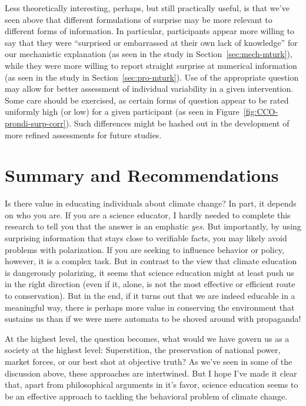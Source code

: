Less theoretically interesting, perhaps, but still practically useful, is that
we've seen above that different formulations of surprise may be more relevant to
different forms of information. In particular, participants appear more willing
to say that they were “surprised or embarrassed at their own lack of knowledge”
for our mechanistic explanation (as seen in the study in
Section~\ref{sec:mech-mturk}), while they were more willing to report straight
surprise at numerical information (as seen in the study in
Section~\ref{sec:pro-mturk}). Use of the appropriate question may allow for
better assessment of individual variability in a given intervention. Some care
should be exercised, as certain forms of question appear to be rated uniformly
high (or low) for a given participant (as seen in
Figure~\ref{fig:CCO-prondi-surp-corr}). Such differences might be hashed out in
the development of more refined assessments for future studies.



\section{Summary and Recommendations}

Is there value in educating individuals about climate change? In part, it
depends on who you are. If you are a science educator, I hardly needed to
complete this research to tell you that the answer is an emphatic \emph{yes}.
But importantly, by using surprising information that stays close to verifiable
facts, you may likely avoid problems with polarization. If you are seeking to
influence behavior or policy, however, it is a complex task.  But in contrast to
the view that climate education is dangerously polarizing, it seems that science
education might at least push us in the right direction (even if it, alone, is
not the most effective or efficient route to conservation). But in the end, if
it turns out that we are indeed educable in a meaningful way, there is perhaps
more value in conserving the environment that sustains us than if we were mere
automata to be shoved around with propaganda!


At the highest level, the question becomes, what would we have govern us as a
society at the highest level: Superstition, the preservation of national power,
market forces, or our best shot at objective truth? As we've seen in some of the
discussion above, these approaches are intertwined. But I hope I've made it
clear that, apart from philosophical arguments in it's favor, science education
seems to be an effective approach to tackling the behavioral problem of climate
change.
